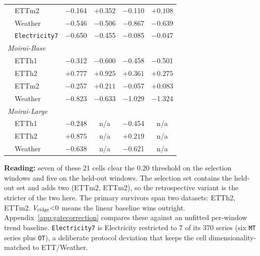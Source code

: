 \begin{table}[t]
\begin{tabular}{ll cc cc}
 & ETTm2                  & $-$0.164 & $\mathbf{+0.352}$ & $-$0.110 & $\mathbf{+0.108}$ \\
 & Weather                & $-$0.546 & $-$0.506 & $-$0.867 & $-$0.639 \\
 & \texttt{Electricity7}  & $-$0.650 & $-$0.455 & $-$0.085 & $-$0.047 \\
\midrule
\multicolumn{6}{l}{\textit{Moirai-Base}} \\
 & ETTh1                  & $-$0.312 & $-$0.600 & $-$0.458 & $-$0.501 \\
 & ETTh2                  & $\mathbf{+0.777}$ & $\mathbf{+0.925}$ & $\mathbf{+0.361}$ & $\mathbf{+0.275}$ \\
 & ETTm2                  & $-$0.257 & $\mathbf{+0.211}$ & $-$0.057 & $\mathbf{+0.083}$ \\
 & Weather                & $-$0.823 & $-$0.633 & $-$1.029 & $-$1.324 \\
\midrule
\multicolumn{6}{l}{\textit{Moirai-Large}} \\
 & ETTh1                  & $-$0.248 & n/a & $-$0.454 & n/a \\
 & ETTh2                  & $\mathbf{+0.875}$ & n/a & $\mathbf{+0.219}$ & n/a \\
 & Weather                & $-$0.638 & n/a & $-$0.621 & n/a \\
\bottomrule
\end{tabular}
\vspace{1pt}

{\footnotesize
\textbf{Reading:} seven of these 21 cells clear the $0.20$ threshold on the selection windows and five on the held-out windows.
The selection set contains the held-out set and adds two (ETTm2, ETTm2), so the retrospective variant is the stricter of the two here.
The primary survivors span two datasets: ETTh2, ETTm2.
$V_{\text{ridge}}{<}0$ means the linear baseline wins outright.
Appendix~\ref{app:gatecorrection} compares these against an unfitted
per-window trend baseline.
\texttt{Electricity7} is Electricity restricted to 7 of its 370 series (six
\texttt{MT} series plus \texttt{OT}), a deliberate protocol deviation that
keeps the cell dimensionality-matched to ETT/Weather.}
\end{table}
